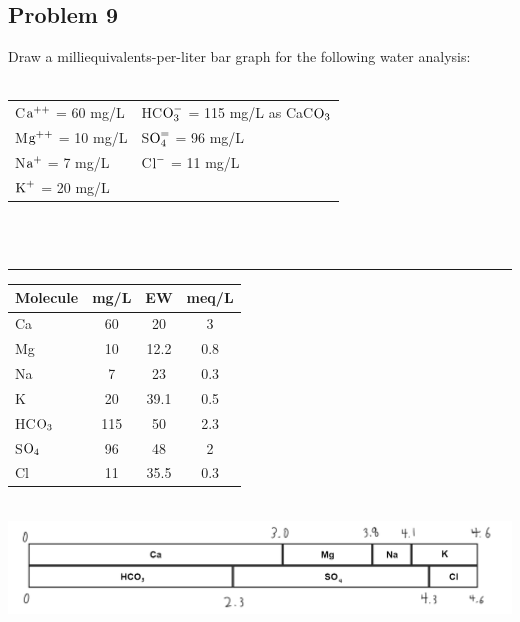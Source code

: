 \subsection*{Problem 9}
Draw a milliequivalents-per-liter bar graph for the following water analysis:\\\\
\begin{tabular}{l l}
    C\(\textnormal{a}^{++}\) = 60 mg/L & HC\(\textnormal{O}_{3}^-\) = 115 mg/L as CaC\(\textnormal{O}_3\) \\
    M\(\textnormal{g}^{++}\) = 10 mg/L & S\(\textnormal{O}_{4}^{=}\) = 96 mg/L \\
    N\(\textnormal{a}^{+}\) = 7 mg/L  &  C\(\textnormal{l}^{-}\) = 11 mg/L \\
    \(\textnormal{K}^{+}\) = 20 mg/L &
\end{tabular}
\\\\
\rule{5cm}{1pt}
\begin{center}
\begin{tabular}{l c c c}
    Molecule & mg/L & EW & meq/L\\
    \hline
    Ca & 60 & 20 & 3\\
    Mg & 10 & 12.2 & 0.8\\
    Na & 7 & 23 & 0.3\\
    K & 20 & 39.1 & 0.5\\
    HC\(\textnormal{O}_3\) & 115 & 50 & 2.3\\
    S\(\textnormal{O}_4\) & 96 & 48 & 2\\
    Cl & 11 & 35.5 & 0.3
\end{tabular}\\
\includegraphics[scale=0.3]{diagram1.png}
\end{center}

